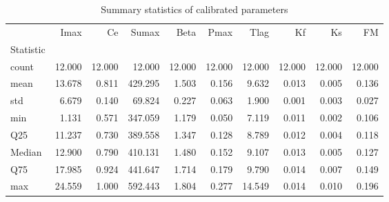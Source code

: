 \begin{table}
\caption{Summary statistics of calibrated parameters}
\label{tab:param_summary}
\begin{tabular}{lrrrrrrrrr}
\toprule
 & Imax & Ce & Sumax & Beta & Pmax & Tlag & Kf & Ks & FM \\
Statistic &  &  &  &  &  &  &  &  &  \\
\midrule
count & 12.000 & 12.000 & 12.000 & 12.000 & 12.000 & 12.000 & 12.000 & 12.000 & 12.000 \\
mean & 13.678 & 0.811 & 429.295 & 1.503 & 0.156 & 9.632 & 0.013 & 0.005 & 0.136 \\
std & 6.679 & 0.140 & 69.824 & 0.227 & 0.063 & 1.900 & 0.001 & 0.003 & 0.027 \\
min & 1.131 & 0.571 & 347.059 & 1.179 & 0.050 & 7.119 & 0.011 & 0.002 & 0.106 \\
Q25 & 11.237 & 0.730 & 389.558 & 1.347 & 0.128 & 8.789 & 0.012 & 0.004 & 0.118 \\
Median & 12.900 & 0.790 & 410.131 & 1.480 & 0.152 & 9.107 & 0.013 & 0.005 & 0.127 \\
Q75 & 17.985 & 0.924 & 441.647 & 1.714 & 0.179 & 9.790 & 0.014 & 0.007 & 0.149 \\
max & 24.559 & 1.000 & 592.443 & 1.804 & 0.277 & 14.549 & 0.014 & 0.010 & 0.196 \\
\bottomrule
\end{tabular}
\end{table}

